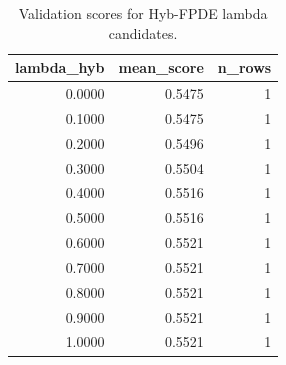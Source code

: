 \begin{table}[t]
\caption{Validation scores for Hyb-FPDE lambda candidates.}
\label{tab:lambda_distribution_computed}
\centering
\begin{tabular}{rrr}
\toprule
lambda\_hyb & mean\_score & n\_rows \\
\midrule
0.0000 & 0.5475 & 1 \\
0.1000 & 0.5475 & 1 \\
0.2000 & 0.5496 & 1 \\
0.3000 & 0.5504 & 1 \\
0.4000 & 0.5516 & 1 \\
0.5000 & 0.5516 & 1 \\
0.6000 & 0.5521 & 1 \\
0.7000 & 0.5521 & 1 \\
0.8000 & 0.5521 & 1 \\
0.9000 & 0.5521 & 1 \\
1.0000 & 0.5521 & 1 \\
\bottomrule
\end{tabular}

\end{table}
